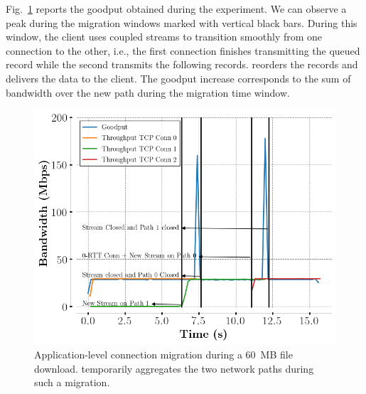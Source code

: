 Fig.~\ref{fig:conn_migration} reports the goodput obtained during the experiment. We can observe a peak during the migration windows marked with
vertical black bars. %
During this window, the client uses coupled streams to transition smoothly from
one \tcp connection to the other, i.e., the first \tcp connection finishes
transmitting the queued \tcpls record while the second transmits the following
records.
\tcpls reorders the records and delivers the data to the client. The goodput increase corresponds to the sum of bandwidth over the new path during the migration time window.

\begin{figure}[!t]
  \begin{center}
    \includegraphics[width=.8\columnwidth]{figures/migration.png}
  \end{center}
  \caption{Application-level connection migration during a 60~MB file download.
    \tcpls temporarily aggregates the two network paths during such a migration.}
  \label{fig:conn_migration}
\end{figure}

